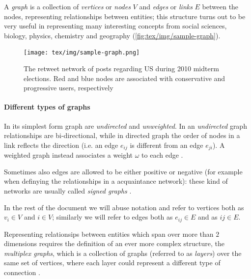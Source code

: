 A \emph{graph} is a collection of \emph{vertices} or \emph{nodes} $V$ and
\emph{edges} or \emph{links} $E$ between the nodes, representing relationships
between entities; this structure turns out to be very useful in
representing many interesting concepts from social sciences, biology, physics,
chemistry and geography (\autoref{fig:tex/img/sample-graph})\cite{Newman2018}\cite{Menczer2020}.

\begin{figure}
	\centering
	\texttt{[image: tex/img/sample-graph.png]}
	\caption[Retweet network during 2010 midterm elections]{The retweet network of posts regarding US during 2010 midterm
		elections. Red and blue nodes are associated with conservative and
		progressive users, respectively \cite{Menczer2020}}%
	\label{fig:tex/img/sample-graph}
\end{figure}

\paragraph{Different types of graphs}%
\label{par:different_types_of_graphs}

In its simplest form graph are \emph{undirected} and \emph{unweighted}. In an
\emph{undirected} graph relationships are bi-directional, while in directed graph
the order of nodes in a link reflects the
direction (i.e. an edge $e_{ij} $ is different from an edge $e_{ji} $). A weighted
graph instead associates a weight $\omega $ to each edge
\cite{Menczer2020}\cite{AlbertLaszloNortheasternUniversity2016}.

Sometimes also edges are allowed to be either positive or negative (for example when
definying the relationships in a acquaintance network): these kind of networks
are usually called \emph{signed graphs} \cite{Newman2018}.

\bigskip

In the rest of the document we will abuse notation and refer to vertices both
as $v_{i} \in V $ and $i \in V$; similarly we will refer to edges both as
$e_{ij} \in E $ and as $ij \in E$.

\bigskip

Representing relationsips between entities which span over more than $2$
dimensions requires the definition of an ever more complex structure, the
\emph{multiplex graphs}, which is a collection of graphs (referred to as
\emph{layers}) over the same set of vertices, where each layer could represent
a different type of connection \cite{Newman2018}.

